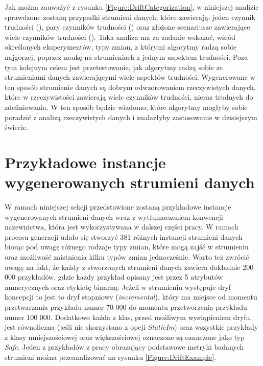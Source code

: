 \noindent Jak można zauważyć z rysunku \ref{Figure:DriftCategorization}, w niniejszej analizie sprawdzone zostaną przypadki strumieni danych, które zawierają: jeden czynnik trudności (), pary czynników trudności () oraz złożone scenariusze zawierające wiele czynników trudności (). Taka analiza ma za zadanie wskazać, wśród określonych eksperymentów, typy zmian, z którymi algorytmy radzą sobie najgorzej, poprzez naukę na strumieniach z jednym aspektem trudności. Poza tym kolejnym celem jest przetestowanie, jak algorytmy radzą sobie ze strumieniami danych zawierającymi wiele aspektów trudności. Wygenerowane w ten sposób strumienie danych są dobrym odwzorowaniem rzeczywistych danych, które w rzeczywistości zawierają wiele czynników trudności, nieraz trudnych do zdefiniowania. W ten sposób będzie wiadomo, które algorytmy mogłyby sobie poradzić z analizą rzeczywistych danych i znalazłyby zastosowanie w dzisiejszym świecie.

\section{Przykładowe instancje wygenerowanych strumieni danych}

\noindent W ramach niniejszej sekcji przedstawione zostaną przykładowe instancje wygenerowanych strumieni danych wraz z wytłumaczeniem konwencji nazewnictwa, która jest wykorzystywana w dalszej części pracy. W ramach procesu generacji udało się stworzyć 381 różnych instancji strumieni danych biorąc pod uwagę różnego rodzaje typy zmian, które mogą zajść w strumieniu oraz możliwość zaistnienia kilku typów zmian jednocześnie. Warto też zwrócić uwagę na fakt, że każdy z stworzonych strumieni danych zawiera dokładnie 200 000 przykładów, gdzie każdy przykład opisany jest przez 5 atrybutów numerycznych oraz etykietę binarną. Jeżeli w strumieniu występuje dryf koncepcji to jest to dryf stopniowy (\textit{incremental}), który ma miejsce od momentu przetwarzania przykładu numer 70 000 do momentu przetworzenia przykładu numer 100 000. Dodatkowo każda z klas, przed możliwym wystąpieniem dryfu, jest równoliczna (jeśli nie skorzystano z opcji \textit{StaticIm}) oraz wszystkie przykłady z klasy mniejszościowej oraz większościowej oznaczone są oznaczone jako typ \textit{Safe}. Jeden z przykładów z pracy \cite{Article:TypyPrzykladow} obrazujący podstawowe metryki badanych strumieni można przeanalizować na rysunku \ref{Figure:DriftExample}.

